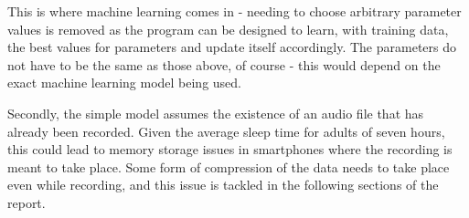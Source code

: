 This is where machine learning comes in - needing to choose arbitrary parameter values is removed as the program can be designed to learn, with training data, the best values for parameters and update itself accordingly. The parameters do not have to be the same as those above, of course - this would depend on the exact machine learning model being used.

Secondly, the simple model assumes the existence of an audio file that has already been recorded. Given the average sleep time for adults of seven hours, this could lead to memory storage issues in smartphones where the recording is meant to take place. Some form of compression of the data needs to take place even while recording, and this issue is tackled in the following sections of the report.